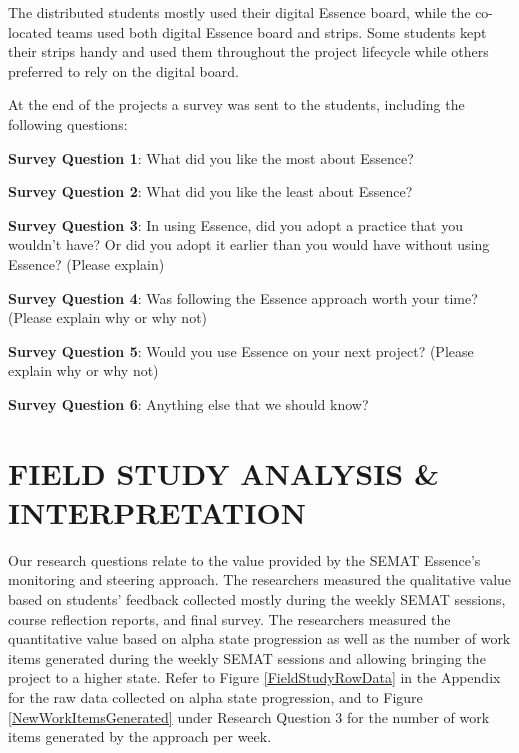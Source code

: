 
The distributed students mostly used their digital Essence board, while the co-located teams used both digital Essence board and strips. Some students kept their strips handy and used them throughout the project lifecycle while others preferred to rely on the digital board.

At the end of the projects a survey was sent to the students, including the following questions:

\textbf{Survey Question 1}: What did you like the most about Essence? 

\textbf{Survey Question 2}: What did you like the least about Essence? 

\textbf{Survey Question 3}: In using Essence, did you adopt a practice that you wouldn't have? Or did you adopt it earlier than you would have without using Essence? (Please explain)

\textbf{Survey Question 4}: Was following the Essence approach worth your time? (Please explain why or why not)

\textbf{Survey Question 5}: Would you use Essence on your next project? (Please explain why or why not)

\textbf{Survey Question 6}: Anything else that we should know?

\section{FIELD STUDY ANALYSIS \& INTERPRETATION}
\label{FieldStudyAnalysis}
Our research questions relate to the value provided by the SEMAT Essence's monitoring and steering approach. The researchers measured the qualitative value based on students' feedback collected mostly during the weekly SEMAT sessions, course reflection reports, and final survey. The researchers measured the quantitative value based on alpha state progression as well as the number of work items generated during the weekly SEMAT sessions and allowing bringing the project to a higher state. Refer to Figure \ref{FieldStudyRowData} in the Appendix for the raw data collected on alpha state progression, and to Figure \ref{NewWorkItemsGenerated} under Research Question 3 for the number of work items generated by the approach per week.

